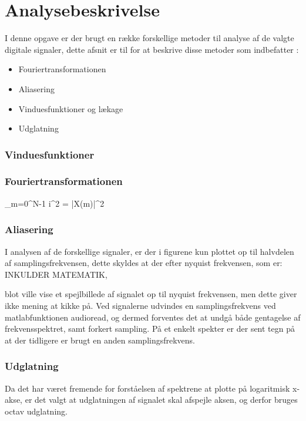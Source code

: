 \chapter{Analysebeskrivelse}\label{ch:analysebeskrivelse}

I denne opgave er der brugt en række forskellige metoder til analyse af de valgte digitale signaler, dette afsnit er til for at beskrive disse metoder som indbefatter :
\begin{itemize}
\item Fouriertransformationen
\item Aliasering
\item Vinduesfunktioner og lækage
\item Udglatning
\end{itemize}
 
\subsection{Vinduesfunktioner} 
 
\subsection{Fouriertransformationen}

\sum\limits_{m=0}^N-1 i^2 = {|X(m)|^2}

\subsection{Aliasering}
I analysen af de forskellige signaler, er der i figurene kun plottet op til halvdelen af samplingsfrekvensen, dette skyldes at der efter nyquist frekvensen, som er: INKULDER MATEMATIK, 

blot ville vise et spejlbillede af signalet op til nyquist frekvensen, men dette giver ikke mening at kikke på. Ved signalerne udvindes en samplingsfrekvens ved matlabfunktionen audioread, og dermed forventes det at undgå både gentagelse af frekvensspektret, samt forkert sampling. På et enkelt spekter er der sent tegn på at der tidligere er brugt en anden samplingsfrekvens.

\subsection{Udglatning}

Da det har været fremende for forståelsen af spektrene at plotte på logaritmisk x-akse, er det valgt at udglatningen af signalet skal afspejle aksen, og derfor bruges octav udglatning.



